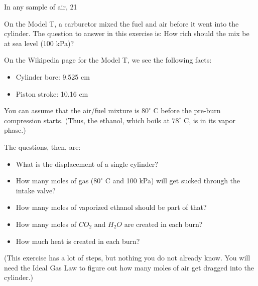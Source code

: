 In any sample of air, 21%
\begin{Exercise}[title={Fuel Mix for the Model T}, label=fuelmix]

On the Model T, a carburetor mixed the fuel and air before it went into the cylinder.  The question to answer in this exercise is: How rich should the mix be at sea level (100 kPa)?

On the Wikipedia page for the Model T, we see the following facts:
\begin{itemize}
\item Cylinder bore: 9.525 cm
\item Piston stroke: 10.16 cm
\end{itemize}

You can assume that the air/fuel mixture is $80^\circ$ C before the pre-burn compression starts. (Thus, the ethanol, which boils at $78^\circ$ C, is in its vapor phase.)

The questions, then, are:

\begin{itemize}
\item What is the displacement of a single cylinder?
\item How many moles of gas ($80^\circ$ C and 100 kPa) will get sucked through the intake valve?
\item How many moles of vaporized ethanol should be part of that?
\item How many moles of $CO_2$ and $H_2O$ are created in each burn?
\item How much heat is created in each burn?
\end{itemize}

(This exercise has a lot of steps, but nothing you do not already know. You will need the Ideal Gas Law to figure out how many moles of air get dragged into the cylinder.)

\end{Exercise}

